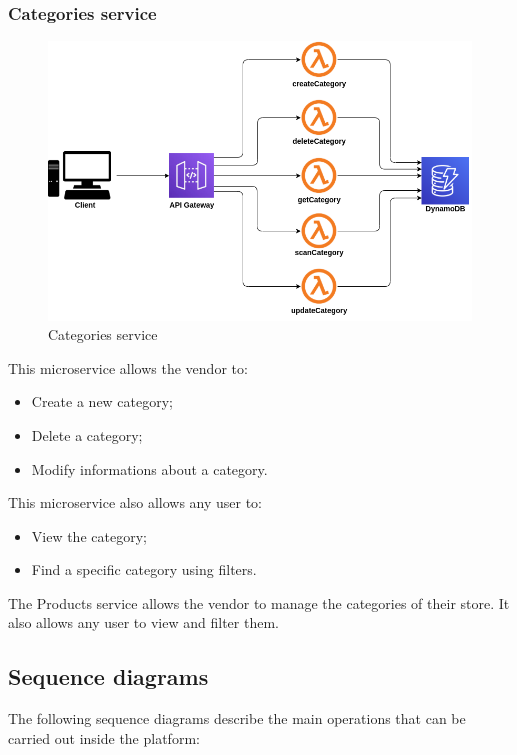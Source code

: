 \subsubsection{Categories service}
\begin{figure}[!h]
    \vspace{5px}
    \includegraphics[scale=0.5]{../../../../Images/Diagrammi/maintainerManual/categoriesService.png}
    \centering
    \caption{Categories service}
\end{figure}
This microservice allows the vendor to:
\begin{itemize}
    \item Create a new category;
    \item Delete a category;
    \item Modify informations about a category.
\end{itemize}
This microservice also allows any user to:
\begin{itemize}
    \item View the category;
    \item Find a specific category using filters.
\end{itemize}
The Products service allows the vendor to manage the categories of their store. It also allows any user to view and filter them.

\pagebreak
\subsection{Sequence diagrams}
The following sequence diagrams describe the main operations that can be carried out inside the platform:

